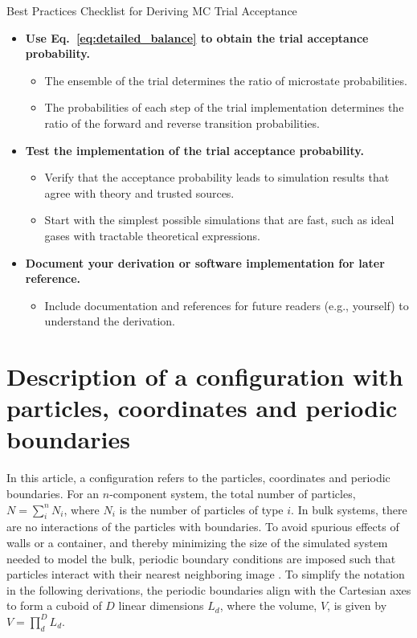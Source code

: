 \documentclass[
  9pt,
  bestpractices,
  pubversion,
]{livecoms}
\begin{document}
\begin{Checklists*}[p!]
\begin{checklist}{Best Practices Checklist for Deriving MC Trial Acceptance}
\begin{itemize}
\item
  \textbf{Use Eq.~\ref{eq:detailed_balance} to obtain the trial acceptance probability.}
  \begin{itemize}
    \item The ensemble of the trial determines the ratio of microstate probabilities.
    \item The probabilities of each step of the trial implementation determines the ratio of the forward and reverse transition probabilities.
  \end{itemize}

\item
  \textbf{Test the implementation of the trial acceptance probability.}
  \begin{itemize}
    \item Verify that the acceptance probability leads to simulation results that agree with theory and trusted sources.
    \item Start with the simplest possible simulations that are fast, such as ideal gases with tractable theoretical expressions.
  \end{itemize}

\item
  \textbf{Document your derivation or software implementation for later reference.}
  \begin{itemize}
    \item Include documentation and references for future readers (e.g., yourself) to understand the derivation.
  \end{itemize}

\end{itemize}
\end{checklist}
\end{Checklists*}


\section{\label{sec:configuration}Description of a configuration with particles, coordinates and periodic boundaries}

In this article, a configuration refers to the particles, coordinates and periodic boundaries.
For an $n$-component system, the total number of particles, $N=\sum_{i}^{n} N_i$, where $N_i$ is the number of particles of type $i$.
In bulk systems, there are no interactions of the particles with boundaries.
To avoid spurious effects of walls or a container, and thereby minimizing the size of the simulated system needed to model the bulk, periodic boundary conditions are imposed such that particles interact with their nearest neighboring image \cite{allen_computer_1989}.
To simplify the notation in the following derivations, the periodic boundaries align with the Cartesian axes to form a cuboid of $D$ linear dimensions $L_d$, where the volume, $V$, is given by $V=\prod_d^D L_d$.
\end{document}
